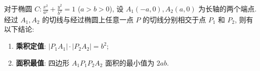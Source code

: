 \begin{statementbox}
对于椭圆 $C: \frac{x^2}{a^2} + \frac{y^2}{b^2} = 1$ ($a>b>0$), 设 $A_1(-a, 0), A_2(a, 0)$ 为长轴的两个端点. 经过 $A_1, A_2$ 的切线与经过椭圆上任意一点 $P$ 的切线分别相交于点 $P_1$ 和 $P_2$, 则有以下结论:
\begin{enumerate}
    \item \textbf{乘积定值}: $|P_1A_1| \cdot |P_2A_2| = b^2$;
    \item \textbf{面积最值}: 四边形 $A_1P_1P_2A_2$ 面积的最小值为 $2ab$.
\end{enumerate}
\end{statementbox}